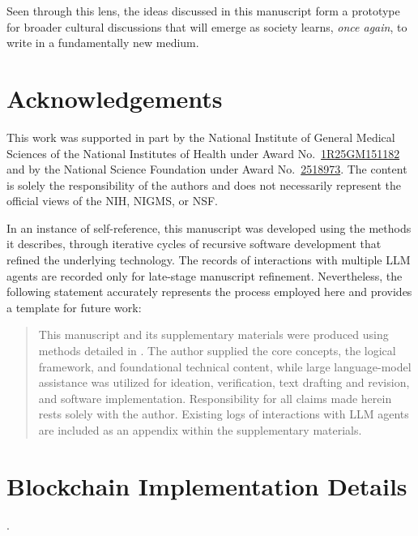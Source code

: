 \documentclass[12pt]{article}
\theoremstyle{definition}
\begin{document}
Seen through this lens, the ideas discussed in this manuscript form a
prototype for broader cultural discussions that will emerge as society
learns, \emph{once again}, to write in a fundamentally new medium.


\section*{Acknowledgements}
This work was supported in part by the National Institute of General
Medical Sciences of the National Institutes of Health under Award
No.\ \href{https://reporter.nih.gov/project-details/10723223#history}{1R25GM151182} and by the National Science Foundation under Award 
No.\ \href{https://www.nsf.gov/awardsearch/showAward?AWD_ID=2518973&HistoricalAwards=false}{2518973}.  The content is solely the responsibility of the authors
and does not necessarily represent the official views of the NIH, NIGMS,
or NSF.

In an instance of self-reference, this manuscript was developed using the methods it describes, through iterative cycles of recursive software development that refined the underlying technology. The records of interactions with multiple LLM agents are recorded only for late-stage manuscript refinement. Nevertheless, the following statement accurately represents the process employed here and provides a template for future work:

\begin{quote}
This manuscript and its supplementary materials were produced using methods detailed in \cite{gutierrez2025flaws}. The author supplied the core concepts, the logical framework, and foundational technical content, while large language-model assistance was utilized for ideation, verification, text drafting and revision, and software implementation. Responsibility for all claims made herein rests solely with the author. Existing logs of interactions with LLM agents are included as an appendix within the supplementary materials.
\end{quote}

\printbibliography

\newpage
\appendix
\section{Blockchain Implementation Details}\label{appendix:blockchain-implementation}. 
\end{document}
